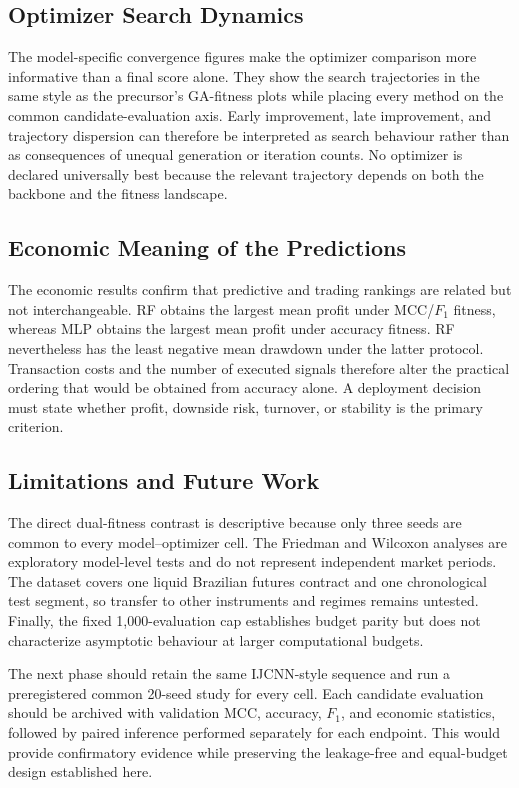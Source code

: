 \subsection{Optimizer Search Dynamics}

The model-specific convergence figures make the optimizer comparison more informative than a final score alone. They show the search trajectories in the same style as the precursor's GA-fitness plots while placing every method on the common candidate-evaluation axis. Early improvement, late improvement, and trajectory dispersion can therefore be interpreted as search behaviour rather than as consequences of unequal generation or iteration counts. No optimizer is declared universally best because the relevant trajectory depends on both the backbone and the fitness landscape.

\subsection{Economic Meaning of the Predictions}

The economic results confirm that predictive and trading rankings are related but not interchangeable. RF obtains the largest mean profit under MCC/$F_1$ fitness, whereas MLP obtains the largest mean profit under accuracy fitness. RF nevertheless has the least negative mean drawdown under the latter protocol. Transaction costs and the number of executed signals therefore alter the practical ordering that would be obtained from accuracy alone. A deployment decision must state whether profit, downside risk, turnover, or stability is the primary criterion.

\subsection{Limitations and Future Work}

The direct dual-fitness contrast is descriptive because only three seeds are common to every model--optimizer cell. The Friedman and Wilcoxon analyses are exploratory model-level tests and do not represent independent market periods. The dataset covers one liquid Brazilian futures contract and one chronological test segment, so transfer to other instruments and regimes remains untested. Finally, the fixed 1,000-evaluation cap establishes budget parity but does not characterize asymptotic behaviour at larger computational budgets.

The next phase should retain the same IJCNN-style sequence and run a preregistered common 20-seed study for every cell. Each candidate evaluation should be archived with validation MCC, accuracy, $F_1$, and economic statistics, followed by paired inference performed separately for each endpoint. This would provide confirmatory evidence while preserving the leakage-free and equal-budget design established here.

